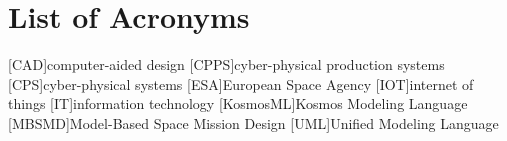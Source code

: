 \chapter*{List of Acronyms}
\begin{acronym}
    [CAD]{computer-aided design}
    [CPPS]{cyber-physical production systems}
    [CPS]{cyber-physical systems}
    [ESA]{European Space Agency}
    [IOT]{internet of things}
    [IT]{information technology}
    [KosmosML]{Kosmos Modeling Language}
    [MBSMD]{Model-Based Space Mission Design}
    [UML]{Unified Modeling Language}
\end{acronym}
